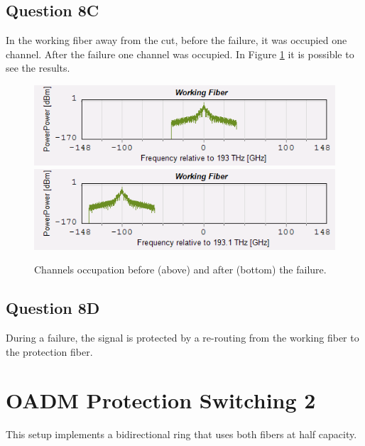 \documentclass[a4paper,10pt]{report}
\begin{document}
\subsection*{Question 8C}
In the working fiber away from the cut, before the failure, it was occupied one channel.
After the failure one channel was occupied.
In Figure \ref{q8c} it is possible to see the results.

\begin{figure}[!ht]
   \centering
   \includegraphics[width=12cm]{q8c1.png}\\
   \includegraphics[width=12cm]{q8c2.png}\\
   \caption{Channels occupation before (above) and after (bottom) the failure.}
   \label{q8c}
\end{figure}

\subsection*{Question 8D}
During a failure, the signal is protected by a re-routing from the working fiber to the protection fiber.



\section*{OADM Protection Switching 2}
This setup implements a bidirectional ring that uses both fibers at half capacity.

\end{document}
